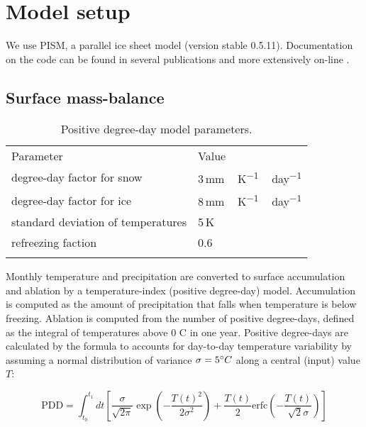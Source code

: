 
\section{Model setup}
\label{sec:model}

We use PISM, a parallel ice sheet model (version stable 0.5.11). Documentation on the code can be found in several publications \citep[e.g.,][]{bueler-brown-2009,winkelmann-etal-2011,aschwanden-etal-2012} and more extensively on-line \citep[{\url{http://www.pism-docs.org}},][]{web:pism}.

\subsection{Surface mass-balance}

\begin{table}[t]
	\caption{Positive degree-day model parameters.}
	\label{tab:pdd}
	\vskip4mm
	\centering
	\begin{tabular}{ll}
		\tophline
		Parameter& Value\\
		\middlehline
		degree-day factor for snow & 3\,\unit{mm\,K^{-1}\,day^{-1}}\\
		degree-day factor for ice & 8\,\unit{mm\,K^{-1}\,day^{-1}}\\
		standard deviation of temperatures & 5\,K\\
		refreezing faction & 0.6 \\
		\bottomhline
	\end{tabular}
\end{table}

Monthly temperature and precipitation are converted to surface accumulation and ablation by a temperature-index (positive degree-day) model. Accumulation is computed as the amount of precipitation that falls when temperature is below freezing. Ablation is computed from the number of positive degree-days, defined as the integral of temperatures above 0\,\degree\,C in one year. Positive degree-days are calculated by the \citet{calov-greve-2011} formula to accounts for day-to-day temperature variability by assuming a normal distribution of variance $\sigma=5^{\circ} C$ along a central (input) value $T$:

\begin{equation}
	\mathrm{PDD} = \int_{t_0}^{t_1} dt \left[
		\frac{\sigma}{\sqrt{2\pi}}
		\exp\left({-\frac{T(t)^2}{2\sigma^2}}\right)
		+\frac{T(t)}{2}
		\mathrm{erfc} \left(-\frac{T(t)}{\sqrt{2}\sigma}\right)
	\right]
\end{equation}

